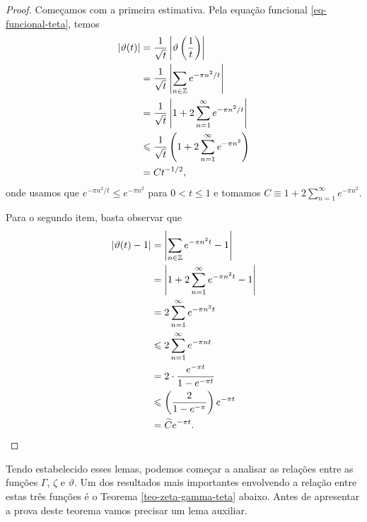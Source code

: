     \begin{proof}
        Começamos com a primeira estimativa. Pela equação funcional \eqref{eq-funcional-teta},
        temos
        \begin{align*}
            |\vartheta(t)| &= \frac{1}{\sqrt{t}}\left| \vartheta\left( \frac{1}{t} \right) \right| \\
                           &= \frac{1}{\sqrt{t}}\left| \sum_{n\in\mathbb{Z}} e^{-\pi n^2/t} \right| \\
                           &= \frac{1}{\sqrt{t}}\left| 1 + 2\sum_{n=1}^{\infty} e^{-\pi n^2/t} \right| \\
                           &\leqslant \frac{1}{\sqrt{t}}\left( 1 + 2\sum_{n=1}^{\infty} e^{-\pi n^2} \right) \\
                           &= Ct^{-1/2},
        \end{align*}
        onde usamos que $e^{-\pi n^2/t} \leq e^{-\pi n^2}$ para $0 < t \leq 1$ e tomamos
        $C \equiv 1 + 2\sum_{n=1}^{\infty} e^{-\pi n^2}$.
        
        Para o segundo item, basta observar que
        \begin{align*}
            |\vartheta(t) - 1| &= \left| \sum_{n\in\mathbb{Z}} e^{-\pi n^2t} - 1 \right| \\
                               &= \left| 1 + 2\sum_{n=1}^{\infty} e^{-\pi n^2t} - 1 \right| \\
                               &= 2\sum_{n=1}^{\infty} e^{-\pi n^2t} \\
                               &\leqslant 2\sum_{n=1}^{\infty} e^{-\pi nt} \\
                               &= 2\cdot\frac{e^{-\pi t}}{1 - e^{-\pi t}} \\
                               &\leqslant \left( \frac{2}{1 - e^{-\pi}} \right)e^{-\pi t} \\
                               &= \widetilde{C}e^{-\pi t}.
        \end{align*}
    \end{proof}
    Tendo estabelecido esses lemas, podemos começar a analisar as relações entre as funções
    $\Gamma$, $\zeta$ e $\vartheta$. 
    Um dos resultados mais importantes envolvendo a relação entre estas
    três funções é o Teorema \ref{teo-zeta-gamma-teta} abaixo. Antes de
    apresentar a prova deste teorema vamos precisar um lema auxiliar. 
    

